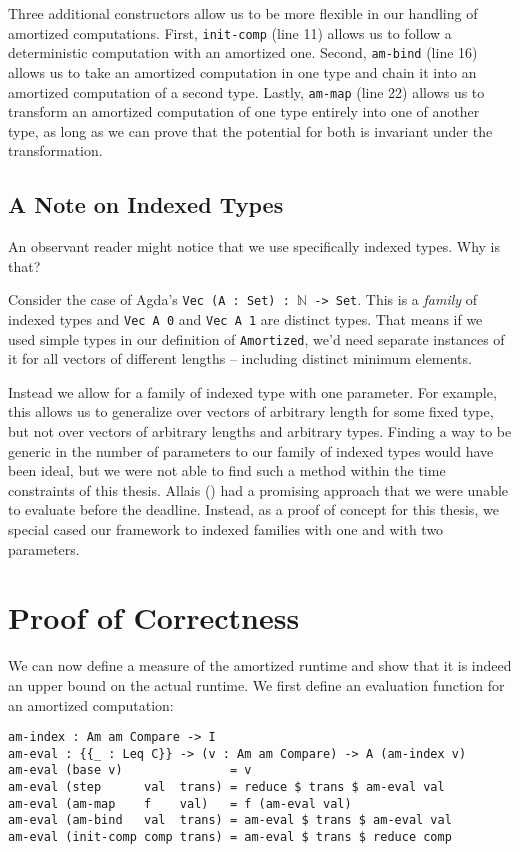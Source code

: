 Three additional constructors allow us to be more flexible in our handling of amortized computations. First, \texttt{init-comp} (line 11) allows us to follow a deterministic computation with an amortized one. Second, \texttt{am-bind} (line 16) allows us to take an amortized computation in one type and chain it into an amortized computation of a second type. Lastly, \texttt{am-map} (line 22) allows us to transform an amortized computation of one type entirely into one of another type, as long as we can prove that the potential for both is invariant under the transformation.

\subsection{A Note on Indexed Types}
An observant reader might notice that we use specifically indexed types. Why is that?

Consider the case of Agda's \texttt{Vec (A : Set) : $\mathbb N$ -> Set}. This is a \emph{family} of indexed types and \texttt{Vec A 0} and \texttt{Vec A 1} are distinct types. That means if we used simple types in our definition of \texttt{Amortized}, we'd need separate instances of it for all vectors of different lengths -- including distinct minimum elements.

Instead we allow for a family of indexed type with one parameter. For example, this allows us to generalize over vectors of arbitrary length for some fixed type, but not over vectors of arbitrary lengths and arbitrary types. Finding a way to be generic in the number of parameters to our family of indexed types would have been ideal, but we were not able to find such a method within the time constraints of this thesis. Allais (\cite{allais:2019:polymorphic-nary-functions}) had a promising approach that we were unable to evaluate before the deadline. Instead, as a proof of concept for this thesis, we special cased our framework to indexed families with one and with two parameters.

\section{Proof of Correctness}
We can now define a measure of the amortized runtime and show that it is indeed an upper bound on the actual runtime. We first define an evaluation function for an amortized computation:

\begin{lstlisting}[caption={Evaluating amortized computations},label={lst:amortized:framework:eval},emph={am,index,eval}]
am-index : Am am Compare -> I
am-eval : {{_ : Leq C}} -> (v : Am am Compare) -> A (am-index v)
am-eval (base v)               = v
am-eval (step      val  trans) = reduce $ trans $ am-eval val
am-eval (am-map    f    val)   = f (am-eval val)
am-eval (am-bind   val  trans) = am-eval $ trans $ am-eval val
am-eval (init-comp comp trans) = am-eval $ trans $ reduce comp
\end{lstlisting}

